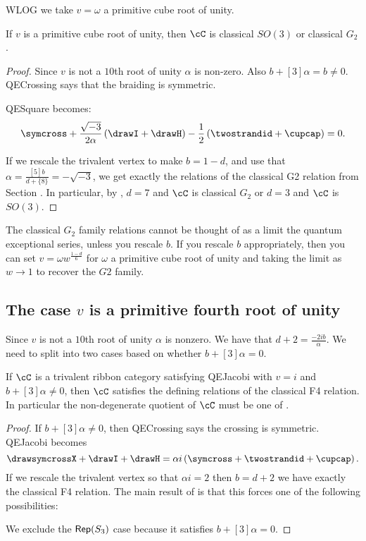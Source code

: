 \documentclass[12pt]{amsart}
\begin{document}
WLOG we take $v = \omega$ a primitive cube root of unity.

\begin{proposition}
If $v$ is a primitive cube root of unity, then $\cC$ is classical $SO(3)$ or classical $G_2$.
\end{proposition}
\begin{proof}
Since $v$ is not a $10$th root of unity $\alpha$ is non-zero.  Also $b+[3]\alpha = b \neq 0$.  QECrossing says that the braiding is symmetric.  

QESquare becomes:
$$\symcross+\frac{\sqrt{-3}}{2\alpha} \left(\drawI + \drawH \right) -\frac{1}{2} \left(\twostrandid + \cupcap \right) = 0.$$

If we rescale the trivalent vertex to make $b= 1-d$, and use that $\alpha = \frac{[5] b}{d+\{8\}} = -\sqrt{-3}$, we get exactly the relations of the classical G2 relation from Section \cite{???}.  In particular, by \cite{1011.6197}, $d = 7$ and $\cC$ is classical $G_2$ or $d=3$ and $\cC$ is $SO(3)$.
\end{proof}

\begin{remark}
The classical $G_2$ family relations cannot be thought of as a limit the quantum exceptional series, unless you rescale $b$.  If you rescale $b$ appropriately, then you can set $v = \omega w^{\frac{1-d}{6}}$ for $\omega$ a primitive cube root of unity and taking the limit as $w \rightarrow 1$ to recover the $G2$ family.
\end{remark}

\subsection{The case \texorpdfstring{$v$}{v} is a primitive fourth root of unity}

Since $v$ is not a $10$th root of unity $\alpha$ is nonzero.  We have that $d+2 = \frac{-2ib}{\alpha}$.
We need to split into two cases based on whether $b+[3]\alpha = 0$.  

\begin{proposition}
If $\cC$ is a trivalent ribbon category satisfying QEJacobi with $v = i$ and $b+[3]\alpha \neq 0$, then $\cC$ satisfies the defining relations of the classical F4 relation.  In particular the non-degenerate quotient of $\cC$ must be one of .
\end{proposition}
\begin{proof}
If $b+[3]\alpha \neq 0$, then QECrossing says the crossing is symmetric.   QEJacobi becomes
$$\drawsymcrossX + \drawI + \drawH = \alpha i \left(\symcross + \twostrandid + \cupcap \right).$$  If we rescale the trivalent vertex so that $\alpha i = 2$ then $b = d+2$ we have exactly the classical F4 relation.  The main result of \cite{F4E6} is that this forces one of the following possibilities:


We exclude the $\operatorname{\mathsf{Rep}}(S_3)$ case because it satisfies $b+[3]\alpha = 0$.
\end{proof}
\end{document}
